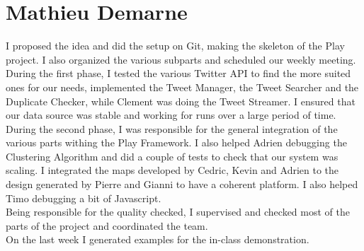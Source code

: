 \section{Mathieu Demarne}

I proposed the idea and did the setup on Git, making the skeleton of the Play project. I also organized the various subparts and scheduled our weekly meeting.\\
During the first phase, I tested the various Twitter API to find the more suited ones for our needs, implemented the Tweet Manager, the Tweet Searcher and the Duplicate Checker, while Clement was doing the Tweet Streamer. I ensured that our data source was stable and working for runs over a large period of time. \\
During the second phase, I was responsible for the general integration of the various parts withing the Play Framework. I also helped Adrien debugging the Clustering Algorithm and did a couple of tests to check that our system was scaling. I integrated the maps developed by Cedric, Kevin and Adrien to the design generated by Pierre and Gianni to have a coherent platform. I also helped Timo debugging a bit of Javascript. \\
Being responsible for the quality checked, I supervised and checked most of the parts of the project and coordinated the team. \\
On the last week I generated examples for the in-class demonstration.